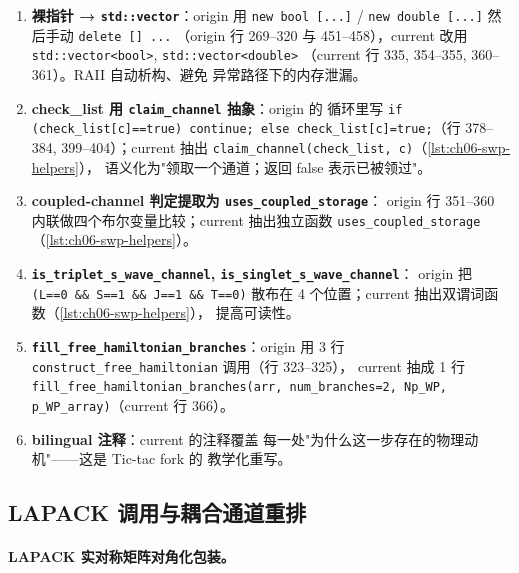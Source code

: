 \begin{enumerate}
  \item \textbf{裸指针 → \texttt{std::vector}}：origin 用 \texttt{new
        bool [...]} / \texttt{new double [...]} 然后手动 \texttt{delete [] ...}
        （origin 行 269--320 与 451--458），current 改用
        \texttt{std::vector<bool>}, \texttt{std::vector<double>}
        （current 行 335, 354--355, 360--361）。RAII 自动析构、避免
        异常路径下的内存泄漏。
  \item \textbf{check\_list 用 \texttt{claim\_channel} 抽象}：origin 的
        循环里写 \texttt{if (check\_list[c]==true) continue; else
        check\_list[c]=true;}（行 378--384, 399--404）；current 抽出
        \texttt{claim\_channel(check\_list, c)}（\cref{lst:ch06-swp-helpers}），
        语义化为"领取一个通道；返回 false 表示已被领过"。
  \item \textbf{coupled-channel 判定提取为 \texttt{uses\_coupled\_storage}}：
        origin 行 351--360 内联做四个布尔变量比较；current 抽出独立函数
        \texttt{uses\_coupled\_storage}（\cref{lst:ch06-swp-helpers}）。
  \item \textbf{\texttt{is\_triplet\_s\_wave\_channel}, \texttt{is\_singlet\_s\_wave\_channel}}：
        origin 把 \texttt{(L==0 \&\& S==1 \&\& J==1 \&\& T==0)} 散布在 4
        个位置；current 抽出双谓词函数（\cref{lst:ch06-swp-helpers}），
        提高可读性。
  \item \textbf{\texttt{fill\_free\_hamiltonian\_branches}}：origin 用 3 行
        \texttt{construct\_free\_hamiltonian} 调用（行 323--325），
        current 抽成 1 行 \texttt{fill\_free\_hamiltonian\_branches(arr,
        num\_branches=2, Np\_WP, p\_WP\_array)}（current 行 366）。
  \item \textbf{bilingual 注释}：current 的注释覆盖
        每一处"为什么这一步存在的物理动机"——这是 Tic-tac fork 的
        教学化重写。
\end{enumerate}

\subsection{LAPACK 调用与耦合通道重排}
\label{subsec:ch06-code-lapack}

\paragraph{LAPACK 实对称矩阵对角化包装。}


